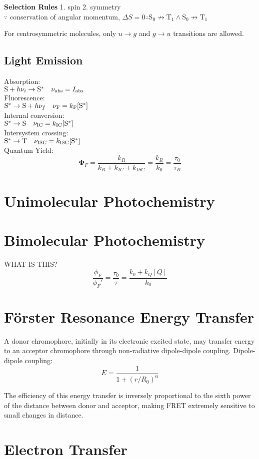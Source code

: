 \textbf{Selection Rules} 1. spin 2. symmetry \\
$\because$ conservation of angular momentum, $\Delta S =0 \therefore \mathrm{S_0} \not\rightarrow \mathrm{T_1} \wedge \mathrm{S_0} \not\rightarrow \mathrm{T_1}$

For centrosymmetric molecules, only $u \rightarrow g$ and  $g \rightarrow u$ transitions are allowed.

\subsection*{Light Emission}

Absorption:\\ $\ce{S} + h\nu_i \rightarrow \ce{S}^{*}\quad \nu_{\mathrm{abs}} = I_{\mathrm{abs}}$\\
Fluorescence:\\ $\ce{S}^{*} \rightarrow \ce{S} + h\nu_f \quad \nu_{\mathrm{F}} = k_{\mathrm{F}} [\ce{S}^{*}]$ \\
Internal conversion:\\ $\ce{S}^{*} \rightarrow \ce{S} \quad \nu_{\mathrm{IC}} = k_{\mathrm{IC}}[\ce{S}^{*}]$ \\
Intersystem crossing:\\ $\ce{S}^{*} \rightarrow \ce{T} \quad \nu_{\mathrm{ISC}} = k_{\mathrm{ISC}}[\ce{S}^{*}]$ \\


Quantum Yield:
$$\mathbf{\Phi}_F = \frac{k_R}{k_R + k_{IC} + k_{ISC}} = \frac{k_R}{k_0} = \frac{\tau_0}{\tau_R}$$

\section{Unimolecular Photochemistry}


\section{Bimolecular Photochemistry}
WHAT IS THIS?
\begin{equation*}
  \frac{\phi_{F}}{\phi_{F}'} = \frac{\tau_0}{\tau} = \frac{k_0 + k_Q[Q]}{k_0}
\end{equation*}
\section{Förster Resonance Energy Transfer}
A donor chromophore, initially in its electronic excited state, may transfer energy to an acceptor chromophore 
through non-radiative dipole-dipole coupling.
Dipole-dipole coupling:
$$E = \frac{1}{1 + (r/R_0)^6}$$

The efficiency of this energy transfer is inversely proportional to the sixth power of the distance between donor 
and acceptor, making FRET extremely sensitive to small changes in distance.

\section{Electron Transfer}
